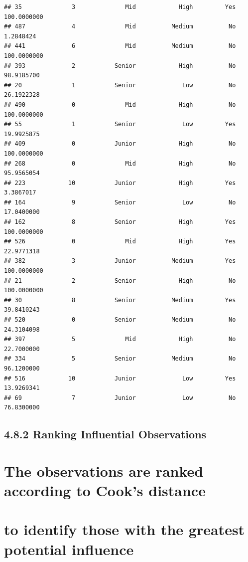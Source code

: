 \documentclass[
]{article}
\begin{document}
\begin{verbatim}
## 35              3              Mid            High         Yes  100.0000000
## 487             4              Mid          Medium          No    1.2848424
## 441             6              Mid          Medium          No  100.0000000
## 393             2           Senior            High          No   98.9185700
## 20              1           Senior             Low          No   26.1922328
## 490             0              Mid            High          No  100.0000000
## 55              1           Senior             Low         Yes   19.9925875
## 409             0           Junior            High          No  100.0000000
## 268             0              Mid            High          No   95.9565054
## 223            10           Junior            High         Yes    3.3867017
## 164             9           Senior             Low          No   17.0400000
## 162             8           Senior            High         Yes  100.0000000
## 526             0              Mid            High         Yes   22.9771318
## 382             3           Junior          Medium         Yes  100.0000000
## 21              2           Senior            High          No  100.0000000
## 30              8           Senior          Medium         Yes   39.8410243
## 520             0           Senior          Medium          No   24.3104098
## 397             5              Mid            High          No   22.7000000
## 334             5           Senior          Medium          No   96.1200000
## 516            10           Junior             Low         Yes   13.9269341
## 69              7           Junior             Low          No   76.8300000
\end{verbatim}

\subsection{4.8.2 Ranking Influential
Observations}\label{ranking-influential-observations}

\section{The observations are ranked according to Cook's
distance}\label{the-observations-are-ranked-according-to-cooks-distance}

\section{to identify those with the greatest potential
influence}\label{to-identify-those-with-the-greatest-potential-influence}
\end{document}
